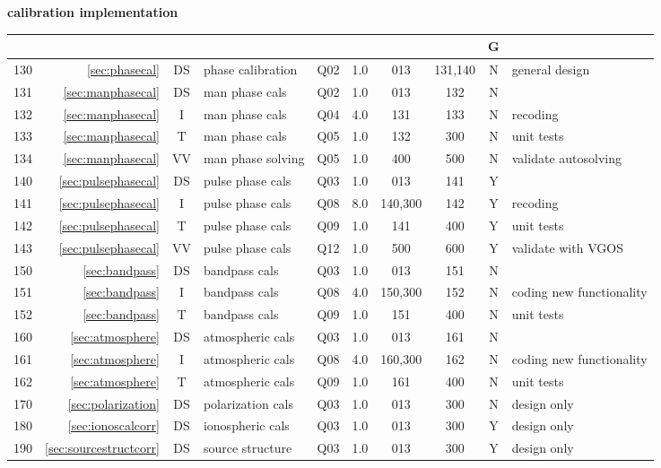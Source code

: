 \small
\textbf{calibration implementation}\hfill\break
\noindent
\begin{tabular}{r|r|c|l|c|c|c|c|c|l}
\hline
\usebox{\NM}&\usebox{\REF}&\usebox{\WW}&\usebox{\TPC}&\usebox{\ST}&\usebox{\EFF}&\usebox{\PRD}&\usebox{\SCC}&G&\usebox{\CMTS}\\
\hline
\hline
130&\ref{sec:phasecal}             &DS& phase calibration    & Q02 & 1.0 & 013     & 131,140 & N & general design \\
131&\ref{sec:manphasecal}          &DS& man phase cals       & Q02 & 1.0 & 013     & 132     & N &  \\
132&\ref{sec:manphasecal}          &I & man phase cals       & Q04 & 4.0 & 131     & 133     & N & recoding \\
133&\ref{sec:manphasecal}          &T & man phase cals       & Q05 & 1.0 & 132     & 300     & N & unit tests \\
134&\ref{sec:manphasecal}          &VV& man phase solving    & Q05 & 1.0 & 400     & 500     & N & validate autosolving \\
140&\ref{sec:pulsephasecal}        &DS& pulse phase cals     & Q03 & 1.0 & 013     & 141     & Y &  \\
141&\ref{sec:pulsephasecal}        &I & pulse phase cals     & Q08 & 8.0 & 140,300 & 142     & Y & recoding \\
142&\ref{sec:pulsephasecal}        &T & pulse phase cals     & Q09 & 1.0 & 141     & 400     & Y & unit tests \\
143&\ref{sec:pulsephasecal}        &VV& pulse phase cals     & Q12 & 1.0 & 500     & 600     & Y & validate with VGOS \\
150&\ref{sec:bandpass}             &DS& bandpass cals        & Q03 & 1.0 & 013     & 151     & N &  \\
151&\ref{sec:bandpass}             &I & bandpass cals        & Q08 & 4.0 & 150,300 & 152     & N & coding new functionality \\
152&\ref{sec:bandpass}             &T & bandpass cals        & Q09 & 1.0 & 151     & 400     & N & unit tests \\
160&\ref{sec:atmosphere}           &DS& atmospheric cals     & Q03 & 1.0 & 013     & 161     & N &  \\
161&\ref{sec:atmosphere}           &I & atmospheric cals     & Q08 & 4.0 & 160,300 & 162     & N & coding new functionality \\
162&\ref{sec:atmosphere}           &T & atmospheric cals     & Q09 & 1.0 & 161     & 400     & N & unit tests \\
170&\ref{sec:polarization}         &DS& polarization cals    & Q03 & 1.0 & 013     & 300     & N & design only \\
180&\ref{sec:ionoscalcorr}         &DS& ionospheric cals     & Q03 & 1.0 & 013     & 300     & Y & design only \\
190&\ref{sec:sourcestructcorr}     &DS& source structure     & Q03 & 1.0 & 013     & 300     & Y & design only \\
\hline
\end{tabular}\vspace{6mm}

